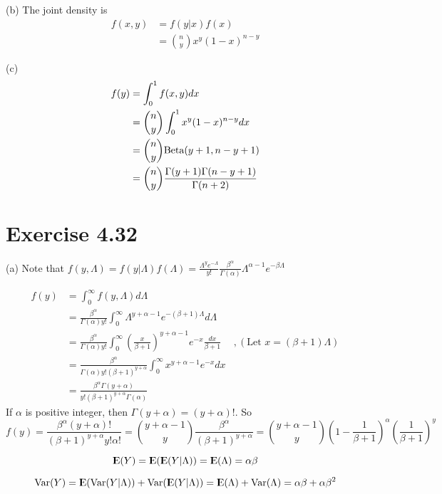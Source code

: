 \documentclass[12pt]{article}
\begin{document}
(b) The joint density is 
$$\begin{aligned}
 f(x, y) &= f(y | x)f(x) \\
 		 &= {n \choose y} x^y (1-x)^{n-y}
\end{aligned} 
$$

(c) 
$$\begin{aligned}
f(y) &= \int_0^1 f(x, y) dx \\ 
&={n \choose y} \int_0^1  x^y (1-x)^{n-y} dx  \\
&= {n \choose y} \text{Beta}(y+1, n-y+1) \\
&= {n \choose y} \frac{\Gamma(y+1)\Gamma(n-y+1)}{\Gamma(n+2)}
\end{aligned} 
$$


\section*{Exercise 4.32}
(a) Note that $f(y, \Lambda) = f(y |\Lambda) f(\Lambda) = \frac{\Lambda^y e^{-\Lambda}}{y!} \frac{\beta^{\alpha}}{\Gamma(\alpha)}\Lambda^{\alpha -1 } e^{-\beta \Lambda}$

$$
\begin{aligned}
f(y) &= \int_0^{\infty} f(y, \Lambda) d\Lambda \\ 
&=  \frac{\beta^{\alpha}}{\Gamma(\alpha)y!} \int_0^{\infty} \Lambda^{y + \alpha -1 } e^{-(\beta +1) \Lambda}  d\Lambda \\
&=  \frac{\beta^{\alpha}}{\Gamma(\alpha)y!} \int_0^{\infty}\left( \frac{x}{\beta+1} \right)^{y + \alpha -1 } e^{-x}  \frac{dx}{\beta+1}  & ,(\mbox{Let } x=(\beta+1)\Lambda) \\
&=  \frac{\beta^{\alpha}}{\Gamma(\alpha)y!(\beta+1)^{y + \alpha}} \int_0^{\infty}x^{y + \alpha -1 } e^{-x} dx \\
&=  \frac{\beta^{\alpha}\Gamma(y + \alpha)}{y!(\beta+1)^{y + \alpha}\Gamma(\alpha)}
\end{aligned} 
$$
If $\alpha$ is positive integer, then $\Gamma(y+\alpha) = (y+\alpha)!$. So $$f(y) =  \frac{\beta^{\alpha}(y + \alpha)!}{(\beta+1)^{y + \alpha}y! \alpha !} = {y+\alpha - 1 \choose y} \frac{\beta^{\alpha}}{(\beta+1)^{y + \alpha}} = {y+\alpha - 1 \choose y} \left( 1 - \frac{1}{\beta+1}\right)^{\alpha} \left(\frac{1}{\beta+1} \right)^y$$

$${\rm I\kern-.3em E}(Y) = {\rm I\kern-.3em E}({\rm I\kern-.3em E}(Y|\Lambda)) = {\rm I\kern-.3em E}(\Lambda) = \alpha \beta $$

$$ \mathrm{Var} (Y) = {\rm I\kern-.3em E} (\mathrm{Var}(Y | \Lambda)) + \mathrm{Var} ({\rm I\kern-.3em E} (Y | \Lambda)) ={\rm I\kern-.3em E} (\Lambda) + \mathrm{Var} (\Lambda) = \alpha \beta + \alpha \beta^2$$
\end{document}
